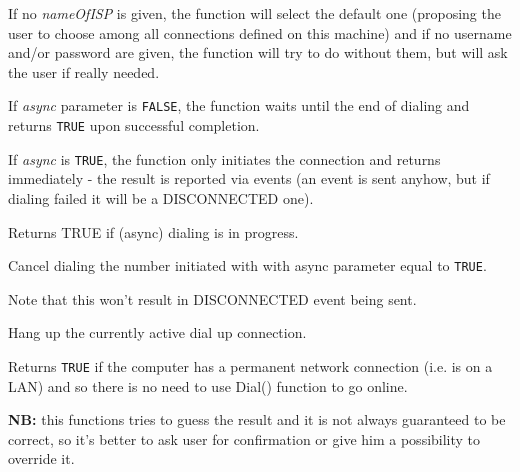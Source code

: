 If no {\it nameOfISP} is given, the function will select the default one
(proposing the user to choose among all connections defined on this machine)
and if no username and/or password are given, the function will try to do
without them, but will ask the user if really needed.

If {\it async} parameter is {\tt FALSE}, the function waits until the end of dialing
and returns {\tt TRUE} upon successful completion.

If {\it async} is {\tt TRUE}, the function only initiates the connection and
returns immediately - the result is reported via events (an event is sent
anyhow, but if dialing failed it will be a DISCONNECTED one).

\label{wxdialupmanagerisdialing}


Returns TRUE if (async) dialing is in progress.



\label{wxdialupmanagercanceldialing}


Cancel dialing the number initiated with  
with async parameter equal to {\tt TRUE}.

Note that this won't result in DISCONNECTED event being sent.



\label{wxdialupmanagerhangup}


Hang up the currently active dial up connection.

\label{wxdialupmanagerisalwaysonline}


Returns {\tt TRUE} if the computer has a permanent network connection (i.e. is
on a LAN) and so there is no need to use Dial() function to go online.

{\bf NB:} this functions tries to guess the result and it is not always
guaranteed to be correct, so it's better to ask user for
confirmation or give him a possibility to override it.


